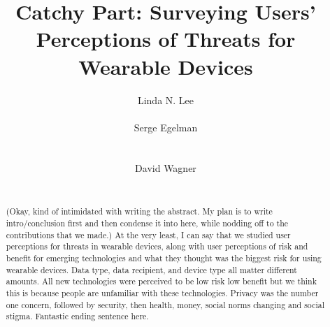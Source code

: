 \documentclass{acm_proc_article-sp}
\begin{document}
\title{Catchy Part: Surveying Users' Perceptions of Threats for Wearable Devices}




\author{
\alignauthor
Linda N. Lee\\
       \\
\alignauthor
Serge Egelman\\
       \\
       \\
\alignauthor David Wagner\\
       \\
}

\maketitle



\begin{abstract}
(Okay, kind of intimidated with writing the abstract. My plan is to write intro/conclusion first and then condense it into here, while nodding off to the contributions that we made.) At the very least, I can say that we studied user perceptions for threats in wearable devices, along with user perceptions of risk and benefit for emerging technologies and what they thought was the biggest risk for using wearable devices. Data type, data recipient, and device type all matter different amounts. All new technologies were perceived to be low risk low benefit but we think this is because people are unfamiliar with these technologies. Privacy was the number one concern, followed by security, then health, money, social norms changing and social stigma. Fantastic ending sentence here.
\end{abstract}

\end{document}
